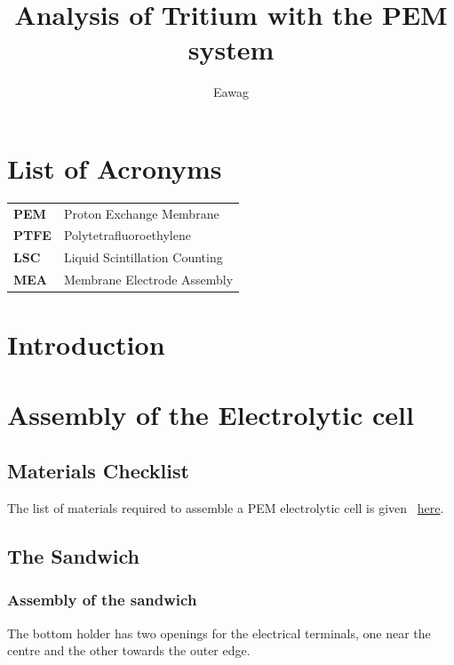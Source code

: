 \documentclass{ol-softwaremanual}
\title{Analysis of Tritium with the PEM system}
\author{Eawag}
\begin{document}
\maketitle

\tableofcontents
\newpage

\section*{List of Acronyms}

\renewcommand{\arraystretch}{1.5}

\begin{tabular}{@{}p{2.2cm}p{10cm}@{}}
\textbf{PEM}  & Proton Exchange Membrane \\

\textbf{PTFE} & Polytetrafluoroethylene \\

\textbf{LSC}  & Liquid Scintillation Counting \\

\textbf{MEA}  & Membrane Electrode Assembly \\
\end{tabular}

\newpage
\section{Introduction}

 

\section{Assembly of the Electrolytic cell}


\subsection{Materials Checklist}
The list of materials required to assemble a PEM electrolytic cell is given ~\href{https://github.com/brennmat/pemPy/tree/main/handbook/Materials%20list}{here}.

 \subsection{The Sandwich}

\subsubsection*{Assembly of the sandwich}
The bottom holder has two openings for the electrical terminals,
one near the centre and the other towards the outer edge.
\end{document}
